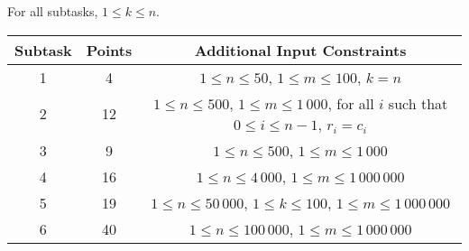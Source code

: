 For all subtasks, $1 \le k \le n$.

\begin{center}
\renewcommand{\arraystretch}{1.5}
\begin{tabular}{|c|c|c|}
\hline
Subtask & Points & Additional Input Constraints\\
\hline
1 & 4 & $1 \le n \le 50$, $1 \le m \le 100$, $k = n$ \\
\hline
2 & 12 & $1 \le n \le 500$, $1 \le m \le 1\,000$, for all
$i$ such that $0 \le i \le n - 1$, $r_i = c_i$ \\
\hline
3 & 9 & $1 \le n \le 500$, $1 \le m \le 1\,000$ \\
\hline
4 & 16 & $1 \le n \le 4\,000$, $1 \le m \le 1\,000\,000$ \\
\hline
5 & 19 & $1 \le n \le 50\,000$, $1 \le k \le 100$, $1 \le m \le 1\,000\,000$ \\
\hline
6 & 40 & $1 \le n \le 100\,000$, $1 \le m \le 1\,000\,000$ \\
\hline
\end{tabular}
\end{center}